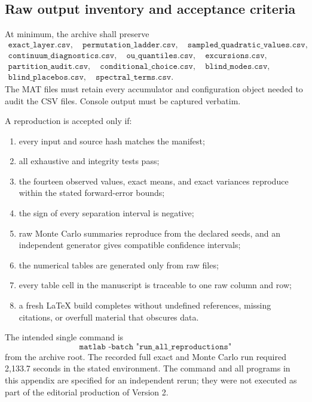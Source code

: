 \documentclass[11pt,reqno]{amsart}
\numberwithin{equation}{section}
\theoremstyle{plain}
\theoremstyle{definition}
\theoremstyle{remark}
\begin{document}
\subsection{Raw output inventory and acceptance criteria}
\label{subsec:raw-output-inventory}

At minimum, the archive shall preserve
\begin{equation}
\begin{gathered}
\texttt{exact\_layer.csv},\quad
\texttt{permutation\_ladder.csv},\quad
\texttt{sampled\_quadratic\_values.csv},\\
\texttt{continuum\_diagnostics.csv},\quad
\texttt{ou\_quantiles.csv},\quad
\texttt{excursions.csv},\\
\texttt{partition\_audit.csv},\quad
\texttt{conditional\_choice.csv},\quad
\texttt{blind\_modes.csv},\\
\texttt{blind\_placebos.csv},\quad
\texttt{spectral\_terms.csv}.
\end{gathered}
\label{eq:required-output-files}
\end{equation}
The MAT files must retain every accumulator and configuration object needed
to audit the CSV files.  Console output must be captured verbatim.

A reproduction is accepted only if:
\begin{enumerate}[label=(\roman*)]
\item every input and source hash matches the manifest;
\item all exhaustive and integrity tests pass;
\item the fourteen observed values, exact means, and exact variances reproduce
within the stated forward-error bounds;
\item the sign of every separation interval is negative;
\item raw Monte Carlo summaries reproduce from the declared seeds, and an
independent generator gives compatible confidence intervals;
\item the numerical tables are generated only from raw files;
\item every table cell in the manuscript is traceable to one raw column and
row;
\item a fresh LaTeX build completes without undefined references, missing
citations, or overfull material that obscures data.
\end{enumerate}

The intended single command is
\begin{equation}
\texttt{matlab -batch "run\_all\_reproductions"}
\label{eq:single-reproduction-command}
\end{equation}
from the archive root.  The recorded full exact and Monte Carlo run required
2,133.7 seconds in the stated environment.  The command and all programs in
this appendix are specified for an independent rerun; they were not executed
as part of the editorial production of Version 2.
\end{document}
